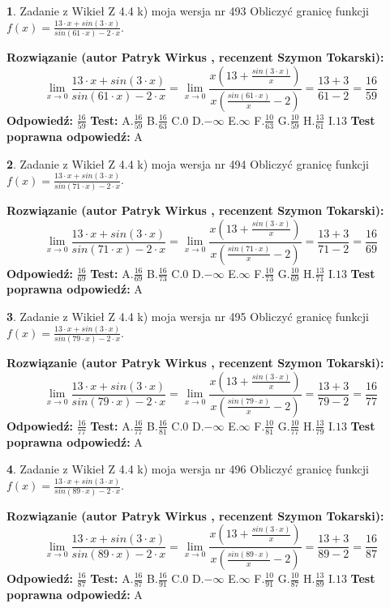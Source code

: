 \documentclass[12pt, a4paper]{article}
\theoremstyle{definition} %
\newtheorem{zad}{}
\newcommand{\zadStart}[1]{\begin{zad}#1\newline}
\newcommand{\zadStop}{\end{zad}}
\newcommand{\rozwStart}[2]{\noindent \textbf{Rozwiązanie (autor #1 , recenzent #2): }\newline}
\newcommand{\rozwStop}{\newline}
\newcommand{\odpStart}{\noindent \textbf{Odpowiedź:}\newline}
\newcommand{\odpStop}{\newline}
\newcommand{\testStart}{\noindent \textbf{Test:}\newline}
\newcommand{\testStop}{\newline}
\newcommand{\kluczStart}{\noindent \textbf{Test poprawna odpowiedź:}\newline}
\newcommand{\kluczStop}{\newline}
\begin{document}
\zadStart{Zadanie z Wikieł Z 4.4 k) moja wersja nr 493}
Obliczyć granicę funkcji $f(x)=\frac{13\cdot x +sin(3\cdot x)}{sin(61\cdot x) -2\cdot x}$.
\zadStop
\rozwStart{Patryk Wirkus}{Szymon Tokarski}
$$\lim\limits_{x\to 0}\frac{13\cdot x +sin(3\cdot x)}{sin(61\cdot x) -2\cdot x}
=\lim\limits_{x\to 0}\frac{x(13+\frac{sin(3\cdot x)}{x})}{x(\frac{sin(61\cdot x)}{x}-2)}
=\frac{13+3}{61-2} = \frac{16}{59}$$
\rozwStop
\odpStart
$\frac{16}{59}$
\odpStop
\testStart
A.$\frac{16}{59}$
B.$\frac{16}{63}$
C.$0$
D.$-\infty$
E.$\infty$
F.$\frac{10}{63}$
G.$\frac{10}{59}$
H.$\frac{13}{61}$
I.$13$
\testStop
\kluczStart
A
\kluczStop



\zadStart{Zadanie z Wikieł Z 4.4 k) moja wersja nr 494}
Obliczyć granicę funkcji $f(x)=\frac{13\cdot x +sin(3\cdot x)}{sin(71\cdot x) -2\cdot x}$.
\zadStop
\rozwStart{Patryk Wirkus}{Szymon Tokarski}
$$\lim\limits_{x\to 0}\frac{13\cdot x +sin(3\cdot x)}{sin(71\cdot x) -2\cdot x}
=\lim\limits_{x\to 0}\frac{x(13+\frac{sin(3\cdot x)}{x})}{x(\frac{sin(71\cdot x)}{x}-2)}
=\frac{13+3}{71-2} = \frac{16}{69}$$
\rozwStop
\odpStart
$\frac{16}{69}$
\odpStop
\testStart
A.$\frac{16}{69}$
B.$\frac{16}{73}$
C.$0$
D.$-\infty$
E.$\infty$
F.$\frac{10}{73}$
G.$\frac{10}{69}$
H.$\frac{13}{71}$
I.$13$
\testStop
\kluczStart
A
\kluczStop



\zadStart{Zadanie z Wikieł Z 4.4 k) moja wersja nr 495}
Obliczyć granicę funkcji $f(x)=\frac{13\cdot x +sin(3\cdot x)}{sin(79\cdot x) -2\cdot x}$.
\zadStop
\rozwStart{Patryk Wirkus}{Szymon Tokarski}
$$\lim\limits_{x\to 0}\frac{13\cdot x +sin(3\cdot x)}{sin(79\cdot x) -2\cdot x}
=\lim\limits_{x\to 0}\frac{x(13+\frac{sin(3\cdot x)}{x})}{x(\frac{sin(79\cdot x)}{x}-2)}
=\frac{13+3}{79-2} = \frac{16}{77}$$
\rozwStop
\odpStart
$\frac{16}{77}$
\odpStop
\testStart
A.$\frac{16}{77}$
B.$\frac{16}{81}$
C.$0$
D.$-\infty$
E.$\infty$
F.$\frac{10}{81}$
G.$\frac{10}{77}$
H.$\frac{13}{79}$
I.$13$
\testStop
\kluczStart
A
\kluczStop



\zadStart{Zadanie z Wikieł Z 4.4 k) moja wersja nr 496}
Obliczyć granicę funkcji $f(x)=\frac{13\cdot x +sin(3\cdot x)}{sin(89\cdot x) -2\cdot x}$.
\zadStop
\rozwStart{Patryk Wirkus}{Szymon Tokarski}
$$\lim\limits_{x\to 0}\frac{13\cdot x +sin(3\cdot x)}{sin(89\cdot x) -2\cdot x}
=\lim\limits_{x\to 0}\frac{x(13+\frac{sin(3\cdot x)}{x})}{x(\frac{sin(89\cdot x)}{x}-2)}
=\frac{13+3}{89-2} = \frac{16}{87}$$
\rozwStop
\odpStart
$\frac{16}{87}$
\odpStop
\testStart
A.$\frac{16}{87}$
B.$\frac{16}{91}$
C.$0$
D.$-\infty$
E.$\infty$
F.$\frac{10}{91}$
G.$\frac{10}{87}$
H.$\frac{13}{89}$
I.$13$
\testStop
\kluczStart
A
\kluczStop
\end{document}
